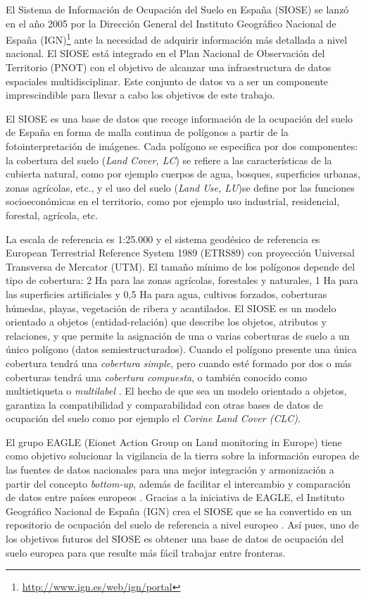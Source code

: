 El Sistema de Información de Ocupación del Suelo en España (SIOSE) se lanzó en el año 2005 por la Dirección General del Instituto Geográfico Nacional de España (IGN)\footnote{\url{http://www.ign.es/web/ign/portal}} ante la necesidad de adquirir información más detallada a nivel nacional. El SIOSE está integrado en el Plan Nacional de Observación del Territorio (PNOT) con el objetivo de alcanzar una infraestructura de datos espaciales multidisciplinar. Este conjunto de datos va a ser un componente imprescindible para llevar a cabo los objetivos de este trabajo.

El SIOSE es una base de datos que recoge información de la ocupación del suelo de España en forma de malla continua de polígonos a partir de la fotointerpretación de imágenes. Cada polígono se especifica por dos componentes: la cobertura del suelo (\textit{Land Cover, LC}) se refiere a las características de la cubierta natural, como por ejemplo cuerpos de agua, bosques, superficies urbanas, zonas agrícolas, etc., y el uso del suelo (\textit{Land Use, LU})se define por las funciones socioeconómicas en el territorio, como por ejemplo uso industrial, residencial, forestal, agrícola, etc.

La escala de referencia es 1:25.000 y el sistema geodésico de referencia es European Terrestrial Reference System 1989 (ETRS89) con proyección Universal Transversa de Mercator (UTM). El tamaño mínimo de los polígonos depende del tipo de cobertura: 2 Ha para las zonas agrícolas, forestales y naturales, 1 Ha para las superficies artificiales y 0,5 Ha para agua, cultivos forzados, coberturas húmedas, playas, vegetación de ribera y acantilados. El SIOSE es un modelo orientado a objetos (entidad-relación) que describe los objetos, atributos y relaciones, y que permite la asignación de una o varias coberturas de suelo a un único polígono (datos semiestructurados). Cuando el polígono presente una única cobertura tendrá una \textit{cobertura simple}, pero cuando esté formado por dos o más coberturas tendrá una \textit{cobertura compuesta}, o también conocido como multietiqueta o \textit{multilabel} \citep{EquipoTecnicoNacionalSIOSE2015}. El hecho de que sea un modelo orientado a objetos, garantiza la compatibilidad y comparabilidad con otras bases de datos de ocupación del suelo como por ejemplo el \textit{Corine Land Cover (CLC)}.


El grupo EAGLE (Eionet Action Group on Land monitoring in Europe) tiene como objetivo solucionar la vigilancia de la tierra sobre la información europea de las fuentes de datos nacionales para una mejor integración y armonización a partir del concepto \textit{bottom-up}, además de facilitar el intercambio y comparación de datos entre países europeos \citep{Arnold2013}. Gracias a la iniciativa de EAGLE, el Instituto Geográfico Nacional de España (IGN) crea el SIOSE que se ha convertido en un repositorio de ocupación del suelo de referencia a nivel europeo \citep{EquipoTecnicoNacionalSIOSE2015}. Así pues, uno de los objetivos futuros del SIOSE es obtener una base de datos de ocupación del suelo europea para que resulte más fácil trabajar entre fronteras.

